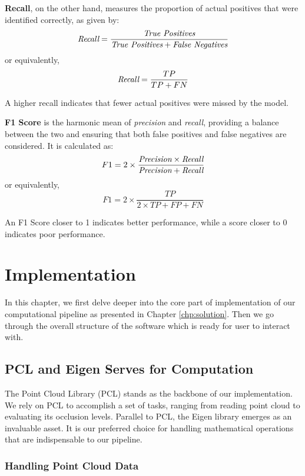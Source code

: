 \documentclass[11pt, a4paper,oneside,chapterprefix=false]{scrbook}
\begin{document}
\vspace{10pt}

\textbf{Recall}, on the other hand, measures the proportion of actual positives that were identified correctly, as given by:
\[
    \emph{Recall} = \frac{\emph{True Positives}}{\emph{True Positives} + \emph{False Negatives}}
\]
or equivalently,
\[
    \emph{Recall} = \frac{TP}{TP + FN}
\]

A higher recall indicates that fewer actual positives were missed by the model.

\vspace{10pt}

\textbf{F1 Score} is the harmonic mean of \emph{precision} and \emph{recall}, providing a balance between the two and ensuring that both false positives and false negatives are considered. It is calculated as:
\[
    F1 = 2 \times \frac{\emph{Precision} \times \emph{Recall}}{\emph{Precision} + \emph{Recall}}
\]
or equivalently,
\[
    F1 = 2 \times \frac{TP}{2 \times TP + FP + FN}
\]

An F1 Score closer to 1 indicates better performance, while a score closer to 0 indicates poor performance.

\chapter{Implementation}\label{chp:implementation}

In this chapter, we first delve deeper into the core part of implementation of our computational pipeline as presented in Chapter \ref{chp:solution}. Then we go through the overall structure of the software which is ready for user to interact with.

\section{PCL and Eigen Serves for Computation}\label{sec:pcl and eigen}

The Point Cloud Library (PCL) stands as the backbone of our implementation. We rely on PCL to accomplish a set of tasks, ranging from reading point cloud to evaluating its occlusion levels. Parallel to PCL, the Eigen library emerges as an invaluable asset. It is our preferred choice for handling mathematical operations that are indispensable to our pipeline.

\subsection{Handling Point Cloud Data}
\end{document}
